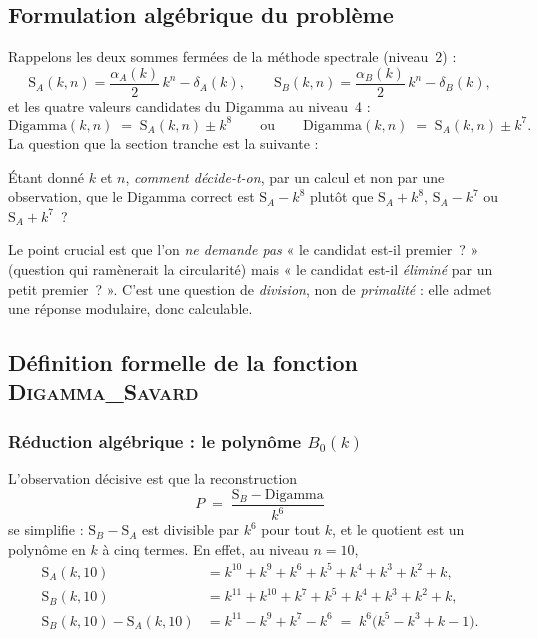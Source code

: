 \documentclass[11pt,a4paper]{article}
\newcommand{\SA}{\mathrm{S}_A}
\newcommand{\SB}{\mathrm{S}_B}
\begin{document}
\subsection{Formulation algébrique du problème}

Rappelons les deux sommes fermées de la méthode spectrale (niveau~2) :
\[
  \SA(k,n) = \frac{\alpha_A(k)}{2}\,k^{n} - \delta_A(k),
  \qquad
  \SB(k,n) = \frac{\alpha_B(k)}{2}\,k^{n} - \delta_B(k),
\]
et les quatre valeurs candidates du Digamma au niveau~4 :
\[
  \mathrm{Digamma}(k,n) \;=\; \SA(k,n) \pm k^{8}
  \qquad\text{ou}\qquad
  \mathrm{Digamma}(k,n) \;=\; \SA(k,n) \pm k^{7}.
\]
La question que la section tranche est la suivante :

\vspace{0.3cm}
\begin{boiteformule}
Étant donné $k$ et $n$, \emph{comment décide-t-on}, par un calcul et non
par une observation, que le Digamma correct est $\SA - k^{8}$ plutôt que
$\SA + k^{8}$, $\SA - k^{7}$ ou $\SA + k^{7}$~?
\end{boiteformule}

Le point crucial est que l'on \emph{ne demande pas} « le candidat est-il
premier~? » (question qui ramènerait la circularité) mais « le candidat
est-il \emph{éliminé} par un petit premier~? ». C'est une question de
\emph{division}, non de \emph{primalité} : elle admet une réponse
modulaire, donc calculable.

\subsection{Définition formelle de la fonction \textsc{Digamma\_Savard}}

\subsubsection{Réduction algébrique : le polynôme \texorpdfstring{$B_0(k)$}{B_0(k)}}
L'observation décisive est que la reconstruction
\[
  P \;=\; \frac{\SB - \mathrm{Digamma}}{k^{6}}
\]
se simplifie : $\SB - \SA$ est divisible par $k^{6}$ pour tout $k$, et le
quotient est un polynôme en $k$ à cinq termes. En effet, au niveau
$n = 10$,
\begin{align*}
  \SA(k,10) &= k^{10}+k^{9}+k^{6}+k^{5}+k^{4}+k^{3}+k^{2}+k,\\
  \SB(k,10) &= k^{11}+k^{10}+k^{7}+k^{5}+k^{4}+k^{3}+k^{2}+k,\\
  \SB(k,10)-\SA(k,10) &= k^{11}-k^{9}+k^{7}-k^{6}
  \;=\; k^{6}\bigl(k^{5}-k^{3}+k-1\bigr).
\end{align*}
\end{document}
